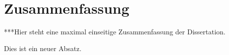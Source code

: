 \chapter*{Zusammenfassung}

***Hier steht eine maximal einseitige Zusammenfassung der
Dissertation.

Dies ist ein neuer Absatz.

